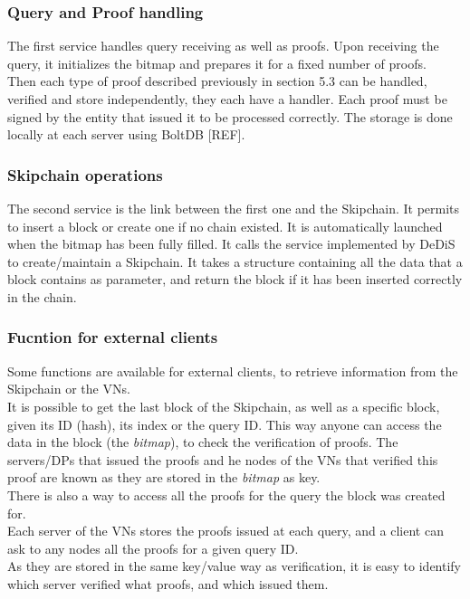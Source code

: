 \documentclass{article}
\begin{document}
\subsubsection{Query and Proof handling}
The first service handles query receiving as well as proofs.
Upon receiving the query, it initializes the bitmap and prepares it for a fixed number of proofs.\\
Then each type of proof described previously in section 5.3 can be handled, verified and store independently, they each have a handler. Each proof must be signed by the entity that issued it to be processed correctly. The storage is done locally at each server using BoltDB [REF].\\

\subsubsection{Skipchain operations}
The second service is the link between the first one and the Skipchain. It permits to insert a block or create one if no chain existed. It is automatically launched when the bitmap has been fully filled. It calls the service implemented by DeDiS to create/maintain a Skipchain. It takes a structure containing all the data that a block contains as parameter, and return the block if it has been inserted correctly in the chain.\\

\subsubsection{Fucntion for external clients}
Some functions are available for external clients, to retrieve information from the Skipchain or the VNs.\\
It is possible to get the last block of the Skipchain, as well as a specific block, given its ID (hash), its index or the query ID. This way anyone can access the data in the block (the \textit{bitmap}), to check the verification of proofs. The servers/DPs that issued the proofs and he nodes of the VNs that verified this proof are known as they are stored in the \textit{bitmap} as key.\\

There is also a way to access all the proofs for the query the block was created for.\\
Each server of the VNs stores the proofs issued at each query, and a client can ask to any nodes all the proofs for a given query ID.\\
As they are stored in the same key/value way as verification, it is easy to identify which server verified what proofs, and which issued them.
\end{document}
